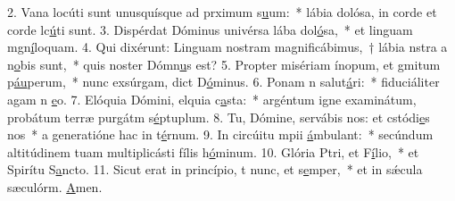 2. Vana locúti sunt unusquísque ad prximum s\uline{u}um:~* lábia dolósa, in corde et corde lc\uline{ú}ti sunt.
3. Dispérdat Dóminus univérsa lába dol\uline{ó}sa,~* et linguam mgn\uline{í}loquam.
4. Qui dixérunt: Linguam nostram magnificábimus,~† lábia nstra a n\uline{o}bis sunt,~* quis noster Dómn\uline{u}s est?
5. Propter misériam ínopum, et gmitum p\uline{áu}perum,~* nunc exsúrgam, dict D\uline{ó}minus.
6. Ponam n salut\uline{á}ri:~* fiduciáliter agam n \uline{e}o.
7. Elóquia Dómini, elquia c\uline{a}sta:~* argéntum igne examinátum, probátum terræ purgátm s\uline{é}ptuplum.
8. Tu, Dómine, servábis nos: et cstódi\uline{e}s nos~* a generatióne hac in t\uline{é}rnum.
9. In circúitu mpii \uline{á}mbulant:~* secúndum altitúdinem tuam multiplicásti fílis h\uline{ó}minum.
10. Glória Ptri, et F\uline{í}lio,~* et Spirítu S\uline{a}ncto.
11. Sicut erat in princípio, t nunc, et s\uline{e}mper,~* et in sǽcula sæculórm. \uline{A}men.
